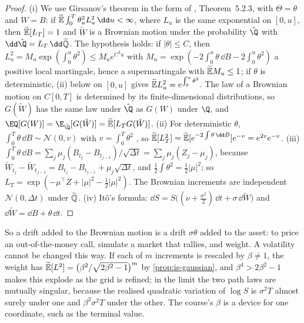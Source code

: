 \begin{proof}
(i) We use Girsanov's theorem in the form of \textcite{shreve2}, Theorem~5.2.3, with
$\Theta=\theta$ and $W=B$: if $\Et\int_0^T\theta_u^2L_u^2\,\dd u<\infty$, where $L_u$ is the
same exponential on $[0,u]$, then $\widetilde{\mathbb E}[L_T]=1$ and $\tilde W$ is a Brownian motion under the
probability $\hat\Q$ with $\dd\hat\Q=L_T\,\dd\Qt$. The hypothesis holds: if $|\theta|\le C$,
then $L_u^2=M_u\exp(\int_0^u\theta^2)\le M_ue^{C^2u}$ with
$M_u=\exp(-2\int_0^u\theta\,\dd B-2\int_0^u\theta^2)$ a positive local martingale, hence a
supermartingale with $\widetilde{\mathbb E} M_u\le1$; if $\theta$ is deterministic, (ii) below on $[0,u]$ gives
$\widetilde{\mathbb E} L_u^2=e^{\int_0^u\theta^2}$. The law of a Brownian motion on $C[0,T]$ is determined by
its finite-dimensional distributions, so $G(\tilde W)$ has the same law under $\hat\Q$ as
$G(W)$ under $\Q$, and $\EQ[G(W)]=\E_{\hat\Q}[G(\tilde W)]=\Et[L_TG(\tilde W)]$.
(ii) For deterministic $\theta$, $\int_0^T\theta\,\dd B\sim\mathcal N(0,v)$ with
$v=\int_0^T\theta^2$ \citep[Theorem~4.4.9]{shreve2}, so
$\Et[L_T^2]=\Et[e^{-2\int\theta\,\dd B}]e^{-v}=e^{2v}e^{-v}$.
(iii) $\int_0^T\theta\,\dd B=\sum_j\mu_j(B_{t_j}-B_{t_{j-1}})/\sqrt{\Delta t}=\sum_j\mu_j(Z_j-\mu_j)$,
because $\tilde W_{t_j}-\tilde W_{t_{j-1}}=B_{t_j}-B_{t_{j-1}}+\mu_j\sqrt{\Delta t}$, and
$\frac12\int\theta^2=\frac12|\mu|^2$; so $L_T=\exp(-\mu^\top Z+|\mu|^2-\frac12|\mu|^2)$. The
Brownian increments are independent $\mathcal N(0,\Delta t)$ under $\widetilde{\mathbb Q}$.
(iv) It\^o's formula: $\dd S=S\big((\nu+\frac{\sigma^2}2)\,\dd t+\sigma\,\dd\tilde W\big)$ and
$\dd\tilde W=\dd B+\theta\,\dd t$.
\end{proof}

So a drift added to the Brownian motion is a drift $\sigma\theta$ added to the asset: to price
an out-of-the-money call, simulate a market that rallies, and weight. A volatility cannot be
changed this way. If each of $m$ increments is rescaled by $\beta\ne1$, the weight has
$\widetilde{\mathbb E}[L^2]=\big(\beta^2/\sqrt{2\beta^2-1}\big)^m$ by \cref{prop:is-gaussian}, and
$\beta^4>2\beta^2-1$ makes this explode as the grid is refined; in the limit the two path
laws are mutually singular, because the realised quadratic variation of $\log S$ is
$\sigma^2T$ almost surely under one and $\beta^2\sigma^2T$ under the other. The course's
$\beta$ is a device for one coordinate, such as the terminal value.

